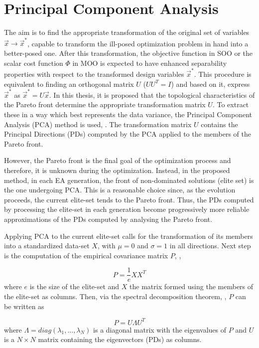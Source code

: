 \section{Principal Component Analysis}
The aim is to find the appropriate transformation of the original set of variables $\vec{x}  \rightarrow \vec{x}^*$, capable to transform the ill-posed optimization problem in hand into a better-posed one. After this transformation, the objective function in SOO or  the scalar cost function $\Phi$ in MOO is expected to have enhanced separability properties with respect to the transformed design variables $\vec{x}^*$.  This procedure is equivalent to finding an orthogonal matrix $U$ ($UU^T=I$) and based on it, express $\vec{x}^*$ as $\vec{x}^*=U\vec{x}$. In this thesis, it is proposed that the topological characteristics of the Pareto front determine the appropriate transformation matrix $U$.  To extract these in a way which best represents the data variance, the Principal Component Analysis (PCA) method is used, \cite{Hayk1999,Jolliffe_2002}. The transformation matrix $U$ contains the Principal Directions (PDs) computed by the PCA applied to the members of the Pareto front.   

However, the Pareto front is the final goal of the optimization process and therefore, it is unknown during the optimization.  Instead, in the proposed method, in each EA generation, the front of non-dominated solutions (elite set) is the one undergoing PCA. This is a reasonable choice since, as the evolution proceeds, the current elite-set tends to the Pareto front. Thus, the PDs computed by processing the elite-set in each generation become progressively more reliable approximations of the PDs computed by analysing the Pareto front.

Applying PCA to the current elite-set calls for the transformation of  its members into a standardized data-set $X$, with $\mu=0$ and $\sigma=1$ in all directions. Next step is the computation of the empirical covariance matrix $P$, \cite{Fodor_2002, Jolliffe_2002},

\begin{equation} 
   P= \frac{1}{e}XX^T
   \label{Cov_Mat} 
\end{equation}
where $e$ is the size of the elite-set and $X$ the matrix formed using  the members of the elite-set as columns. Then, via the spectral decomposition theorem, \cite{Axler_1997, Fodor_2002}, $P$ can be written as

\begin{equation} 
   P= U\Lambda U^T
   \label{spectral}
\end{equation}
where $\Lambda\!=\!diag(\lambda_1 , . . . , \lambda_N )$ is a diagonal matrix with the eigenvalues of $P$ and $U$ is a $N\!\times\!N$ matrix containing the eigenvectors (PDs) as columns. 

